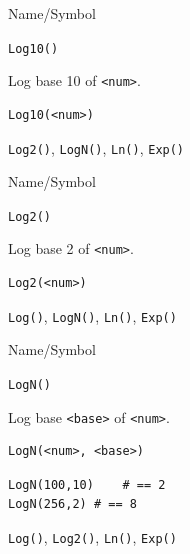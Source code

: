 \begin{desc}{Name/Symbol}
\item[Name/Symbol]	\verb+Log10()+

\item[Description]	Log base 10 of \verb+<num>+.

\item[Usage]
\begin{verbatim}
Log10(<num>)
\end{verbatim}

\item[Example]	

\item[See Also]	\verb+Log2()+, \verb+LogN()+, \verb+Ln()+, \verb+Exp()+
\end{desc}

\begin{desc}{Name/Symbol}
\item[Name/Symbol]	\verb+Log2()+

\item[Description]	Log base 2 of \verb+<num>+.

\item[Usage]
\begin{verbatim}
Log2(<num>)
\end{verbatim}

\item[Example]	

\item[See Also]	\verb+Log()+, \verb+LogN()+, \verb+Ln()+, \verb+Exp()+
\end{desc}

\begin{desc}{Name/Symbol}
\item[Name/Symbol]	\verb+LogN()+

\item[Description]	Log base \verb+<base>+ of \verb+<num>+.

\item[Usage]
\begin{verbatim}
LogN(<num>, <base>)
\end{verbatim}

\item[Example]
\begin{verbatim}
LogN(100,10)	# == 2
LogN(256,2)	# == 8
\end{verbatim}

\item[See Also]	\verb+Log()+, \verb+Log2()+, \verb+Ln()+, \verb+Exp()+
\end{desc}

